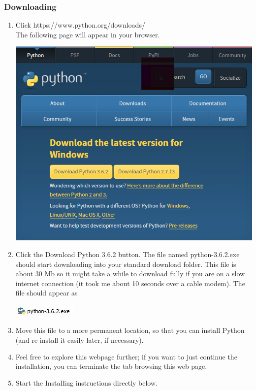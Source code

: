 \documentclass[11pt]{article}
\begin{document}
\begin{multicols}{2}
\subsubsection{Downloading}
\begin{enumerate}
\item Click https://www.python.org/downloads/
\\The following page will appear in your browser.
\begin{center}
\includegraphics[scale=0.40]{1.jpg} \\ 
\end{center}
\item Click the Download Python 3.6.2 button.
The file named python-3.6.2.exe should start downloading into your standard download folder. This file is about 30 Mb so it might take a while to download fully if you are on a slow internet connection (it took me about 10 seconds over a cable modem).
The file should appear as
\begin{center}
\includegraphics[scale=1.50]{2.jpg} \\ 
\end{center}
\item Move this file to a more permanent location, so that you can install Python (and re-install it easily later, if necessary).
\item Feel free to explore this webpage further; if you want to just continue the installation, you can terminate the tab browsing this web page.
\item Start the Installing instructions directly below.
\end{enumerate}

\end{multicols}
\end{document}
